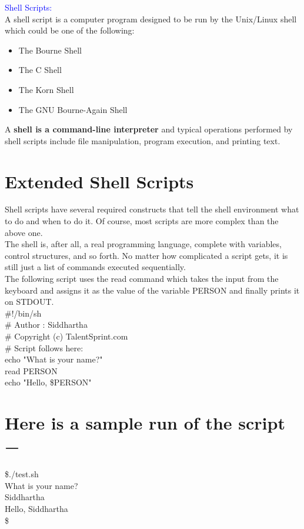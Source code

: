 \documentclass{article}
\begin{document}
\textcolor{blue}{Shell Scripts:}\\
\noindent
A shell script is a computer program designed to be run by the Unix/Linux shell which could be one of the following:\\
\begin{itemize}
    \item The Bourne Shell
    \item The C Shell
    \item The Korn Shell
    \item The GNU Bourne-Again Shell
\end{itemize}
A \textbf{shell is a command-line interpreter} and typical operations performed by shell scripts include file manipulation, program execution, and printing text.

\section*{Extended Shell Scripts}
Shell scripts have several required constructs that tell the shell environment what to do and when to do it. Of course, most scripts are more complex than the above one.\\
The shell is, after all, a real programming language, complete with variables, control structures, and so forth. No matter how complicated a script gets, it is still just a list of commands executed sequentially.\\
The following script uses the read command which takes the input from the keyboard and assigns it as the value of the variable PERSON and finally prints it on STDOUT.\\
\#!/bin/sh\\
\# Author : Siddhartha\\
\# Copyright (c) TalentSprint.com\\
\# Script follows here:\\
echo "What is your name?"\\
read PERSON\\
echo "Hello, \$PERSON"\\

\section*{Here is a sample run of the script −}
\$./test.sh\\
What is your name?\\
Siddhartha\\
Hello, Siddhartha\\
\$
\end{document}
